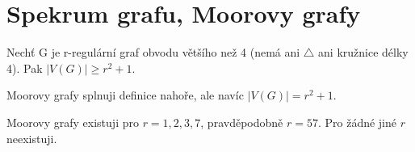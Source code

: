 \section{\texorpdfstring{Spekrum grafu, Moorovy grafy}{Spekrum grafu, Moorovy grafy}}
\vspace{5mm}
\large

\begin{definition}
Nechť G je r-regulární graf obvodu většího než 4 (nemá ani $\triangle$ ani kružnice délky 4). Pak $|V(G)| \geq r^2 + 1$.
\end{definition}
\begin{definition}
Moorovy grafy splnuji definice nahoře, ale navíc $|V(G)| = r^2 + 1$.
\end{definition}

\begin{theorem}
	Moorovy grafy existuji pro $r = 1,2,3,7$, pravděpodobně $r = 57$. Pro žádné jiné $r$ neexistuji.
\end{theorem}
